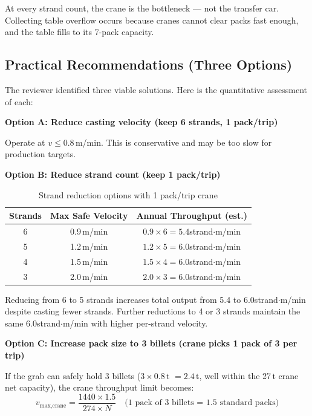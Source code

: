 \documentclass[11pt,a4paper]{article}
\begin{document}
At every strand count, the crane is the bottleneck --- not the transfer car. Collecting table overflow occurs because cranes cannot clear packs fast enough, and the table fills to its 7-pack capacity.

\subsection{Practical Recommendations (Three Options)}

The reviewer identified three viable solutions. Here is the quantitative assessment of each:

\textbf{Option A: Reduce casting velocity (keep 6 strands, 1 pack/trip)}

Operate at $v \leq 0.8$\,m/min. This is conservative and may be too slow for production targets.

\textbf{Option B: Reduce strand count (keep 1 pack/trip)}

\begin{table}[H]
\centering
\caption{Strand reduction options with 1 pack/trip crane}
\label{tab:strand-reduction}
\begin{tabular}{@{}ccc@{}}
\toprule
Strands & Max Safe Velocity & Annual Throughput (est.) \\
\midrule
6 & 0.9\,m/min & $0.9 \times 6 = 5.4$\;strand$\cdot$m/min \\
5 & 1.2\,m/min & $1.2 \times 5 = 6.0$\;strand$\cdot$m/min \\
4 & 1.5\,m/min & $1.5 \times 4 = 6.0$\;strand$\cdot$m/min \\
3 & 2.0\,m/min & $2.0 \times 3 = 6.0$\;strand$\cdot$m/min \\
\bottomrule
\end{tabular}
\end{table}

Reducing from 6 to 5 strands increases total output from 5.4 to 6.0\;strand$\cdot$m/min despite casting fewer strands. Further reductions to 4 or 3 strands maintain the same 6.0\;strand$\cdot$m/min with higher per-strand velocity.

\textbf{Option C: Increase pack size to 3 billets (crane picks 1 pack of 3 per trip)}

If the grab can safely hold 3 billets ($3 \times 0.8$\,t $= 2.4$\,t, well within the 27\,t crane net capacity), the crane throughput limit becomes:
\begin{equation}
v_\text{max,crane} = \frac{1440 \times 1.5}{274 \times N}\quad\text{(1 pack of 3 billets = 1.5 standard packs)}
\end{equation}
\end{document}
